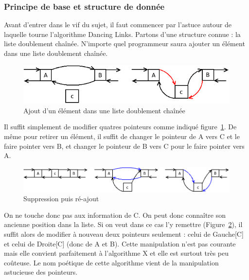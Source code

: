 \documentclass[a4paper]{article}
\begin{document}
\subsubsection{Principe de base et structure de donnée}

Avant d'entrer dans le vif du sujet, il faut commencer par l'astuce autour de 
laquelle tourne l'algorithme Dancing Links.
Partons d'une structure connue : la liste doublement chaînée.
N'importe quel programmeur saura ajouter un élément dans une liste doublement
chaînée.


\begin{figure}[h]
\begin{center}
\includegraphics[scale=0.5]{../imports/add_elmt_dll.png}
\caption{\label{add_dll} Ajout d'un élément dans une liste doublement chaînée}
\end{center}
\end{figure}


Il suffit simplement de modifier quatres pointeurs comme indiqué 
figure~\ref{add_dll}. De même pour retirer un élément, il suffit de changer le 
pointeur de A vers C et le faire pointer vers B, et changer le pointeur de 
B vers C pour le faire pointer vers A. 

\begin{figure}[h]
\begin{center}
\includegraphics[scale=0.5]{../imports/delete.png}
\caption{\label{delete_dll} Suppression puis ré-ajout}
\end{center}
\end{figure}

On ne touche donc pas aux information de C. 
On peut donc connaître son ancienne position dans la liste. Si on veut
dans ce cas l'y remettre (Figure~\ref{delete_dll}), il suffit alors de modifier
à nouveau deux pointeurs
seulement : celui de Gauche[C] et celui de Droite[C] (donc de A et B).
Cette manipulation n'est pas courante mais elle convient parfaitement à 
l'algorithme X et elle est surtout très peu coûteuse.
Le nom poétique de cette algorithme vient de la manipulation astucieuse des 
pointeurs.
\end{document}

